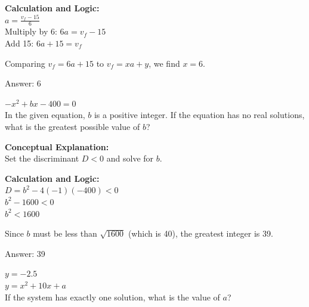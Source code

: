 \documentclass[11pt,paper=a4,answers]{exam}
\begin{document}
\begin{questions}
\begin{solution}
\vspace{20pt}

\textbf{Calculation and Logic:} \\
$a = \frac{v_f - 15}{6}$ \\
Multiply by 6: $6a = v_f - 15$ \\
Add 15: $6a + 15 = v_f$

\vspace{10pt}

Comparing $v_f = 6a + 15$ to $v_f = xa + y$, we find $x = 6$.

\vspace{25pt}

Answer: \colorbox{yellow!100}{6}
\end{solution}

\vspace{40pt}

\question
$-x^2 + bx - 400 = 0$ \\
In the given equation, $b$ is a positive integer. If the equation has no real solutions, what is the greatest possible value of $b$?

\begin{solution}
\textbf{Conceptual Explanation:} \\
Set the discriminant $D < 0$ and solve for $b$.

\vspace{20pt}

\textbf{Calculation and Logic:} \\
$D = b^2 - 4(-1)(-400) < 0$ \\
$b^2 - 1600 < 0$ \\
$b^2 < 1600$

\vspace{10pt}

Since $b$ must be less than $\sqrt{1600}$ (which is 40), the greatest integer is 39.

\vspace{25pt}

Answer: \colorbox{yellow!100}{39}
\end{solution}

\vspace{40pt}

\question
$y = -2.5$ \\
$y = x^2 + 10x + a$ \\
If the system has exactly one solution, what is the value of $a$?


\end{questions}
\end{document}
